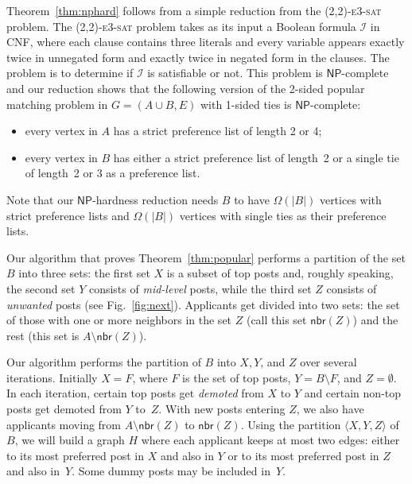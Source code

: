 \documentclass[11pt]{llncs}
\newcommand{\Nbr}{\mathsf{nbr}}
\begin{document}
Theorem~\ref{thm:nphard} follows from a simple reduction from the \textsc{(2,2)-e3-sat} problem. The \textsc{(2,2)-e3-sat} problem takes as its input a Boolean formula $\mathcal{I}$ in CNF, where each clause contains three literals and every variable appears exactly twice in unnegated form and exactly twice in negated form in the clauses. The problem is to determine if $\mathcal{I}$ 
is satisfiable or not. This problem is $\mathsf{NP}$-complete~\cite{BKS03} and our reduction shows that the following
version of the 2-sided popular matching problem in $G = (A\cup B,E)$ with 1-sided ties is $\mathsf{NP}$-complete: 
\begin{itemize}
\item every vertex in $A$ has a strict preference list of length 2 or 4;
\item every vertex in $B$ has either a strict preference list of length~2 or a single tie of length~2 or 3 as a preference list.
\end{itemize}
Note that our $\mathsf{NP}$-hardness reduction needs $B$ to have $\Omega(|B|)$ vertices with 
strict preference lists and $\Omega(|B|)$ vertices with single ties as their preference lists.

Our algorithm that proves Theorem~\ref{thm:popular} performs a partition of the set $B$ into three sets: 
the first set $X$ is a subset of top posts and, roughly speaking, the second set $Y$ consists of 
{\em mid-level} posts, while the third set $Z$ consists of {\em unwanted} posts 
(see Fig.~\ref{fig:next}). Applicants get divided into two sets: the set of those with one or 
more neighbors in the set $Z$ (call this set $\Nbr(Z)$) and the rest (this set is 
$A\setminus\Nbr(Z)$).  

Our algorithm performs the partition of $B$ into $X, Y$, and $Z$ over several iterations. 
Initially $X = F$, where $F$ is the set of top posts, $Y = B \setminus F$, and $Z = \emptyset$.
In each iteration, certain top posts get {\em demoted} from $X$ to $Y$ and certain non-top 
posts get demoted from $Y$ to~$Z$. With new posts entering $Z$, we also have applicants
moving from $A\setminus\Nbr(Z)$ to $\Nbr(Z)$. Using the partition $\langle X,Y,Z\rangle$ of 
$B$, we will build a graph $H$ where each applicant keeps at most two edges: either 
to its most preferred post in $X$ and also in $Y$ or to its most preferred post in $Z$ and 
also in~$Y$. Some dummy posts may be included in~$Y$.
\end{document}
